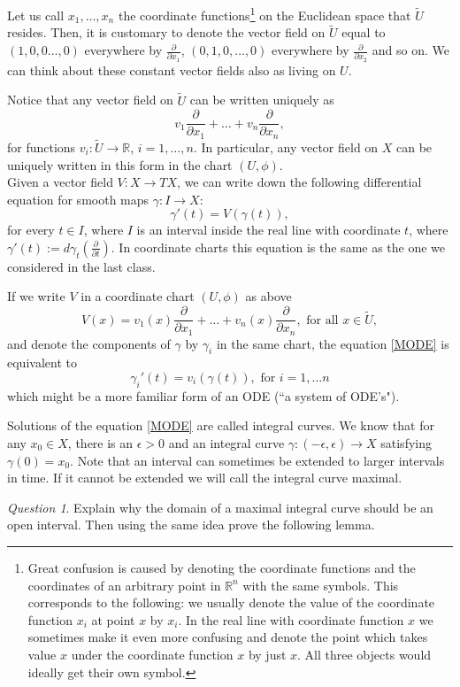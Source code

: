 \documentclass[12pt]{amsart}
\theoremstyle{remark}
\newtheorem{question}{Question}
\begin{document}
Let us call $x_1,\ldots, x_n$ the coordinate functions\footnote{Great confusion is caused by denoting the coordinate functions and the coordinates of an arbitrary point in $\mathbb{R}^n$ with the same symbols. This corresponds to the following: we usually denote the value of the coordinate function $x_i$ at point $x$ by $x_i$. In the real line with coordinate function $x$ we sometimes make it even more confusing and denote the point which takes value $x$ under the coordinate function $x$ by just $x$. All three objects would ideally get their own symbol. } on the Euclidean space that $\tilde{U}$ resides. Then, it is customary to denote the vector field on $\tilde{U}$ equal to $(1,0,0\ldots ,0)$ everywhere by $\frac{\partial}{\partial x_1}$, $(0,1,0,\ldots ,0)$ everywhere by $\frac{\partial}{\partial x_2}$ and so on. We can think about these constant vector fields also as living on $U$. 

Notice that any vector field on $\tilde{U}$ can be written uniquely as $$v_1\frac{\partial}{\partial x_1}+\ldots +v_n\frac{\partial}{\partial x_n},$$ for functions $v_i:\tilde{U}\to \mathbb{R}$, $i=1,\ldots ,n$. In particular, any  vector field on $X$ can be uniquely written in this form in the chart $(U,\phi)$.\\

Given a vector field $V:X\to TX$, we can write down the following differential equation for smooth maps $\gamma: I\to X$: \begin{equation}\label{MODE}\gamma'(t)=V(\gamma(t)),\end{equation} for every $t\in I$, where $I$ is an interval inside the real line with coordinate $t$, where $\gamma'(t):=d\gamma_t\left(\frac{\partial}{\partial t}\right).$ In coordinate charts this equation is the same as the one we considered in the last class.

If we write $V$ in a coordinate chart $(U,\phi)$ as above$$V(x)=v_1(x)\frac{\partial}{\partial x_1}+\ldots +v_n(x)\frac{\partial}{\partial x_n},\text{ for all } x\in\tilde{U},$$ and denote the components of $\gamma$ by $\gamma_i$ in the same chart, the equation \eqref{MODE} is equivalent to $$\gamma_i'(t)=v_i(\gamma(t)), \text{ for }i=1,\ldots n$$ which might be  a more familiar form of an ODE (``a system of ODE's").

Solutions of the equation \eqref{MODE} are called integral curves. We know that for any $x_0\in X$, there is an $\epsilon>0$ and an integral curve $\gamma:(-\epsilon,\epsilon)\to X$ satisfying $\gamma(0)=x_0$. Note that an interval can sometimes be extended to larger intervals in time. If it cannot be extended we will call the integral curve maximal.
\begin{question}\label{qescape}
Explain why the domain of a maximal integral curve should be an open interval. Then using the same idea prove the following lemma.
\end{question}
\end{document}
